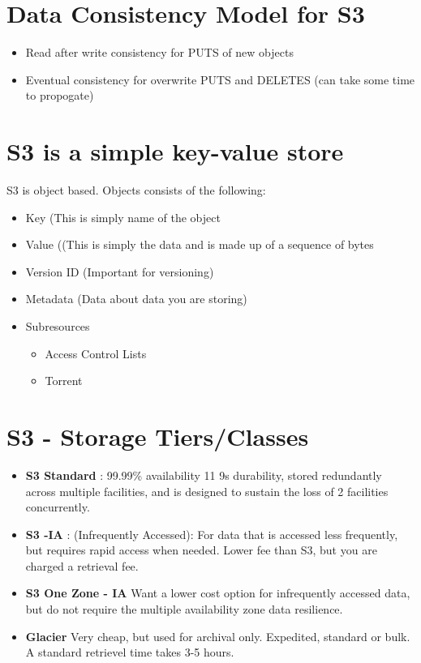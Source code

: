 \documentclass{article}
\begin{document}
\section{Data Consistency Model for S3}
\begin{itemize}
\item
Read after write consistency for PUTS of new objects

\item
Eventual consistency for overwrite PUTS and DELETES (can take some time to propogate)
\end{itemize}

\section{S3 is a simple key-value store}
S3 is object based. Objects consists of the following:
\begin{itemize}
\item
Key (This is simply name of the object
\item
Value ((This is simply the data and is made up of a sequence of bytes
\item
Version ID (Important for versioning)
\item
Metadata (Data about data you are storing)
\item
Subresources
	\begin{itemize}
	\item
	Access Control Lists
	
	\item
	Torrent
	
	\end{itemize}
\end{itemize}

\section{S3 - Storage Tiers/Classes}
\begin{itemize}
\item
\textbf{S3 Standard} : 99.99\% availability 11 9s durability, stored redundantly across multiple facilities, and is designed to sustain the loss of 2 facilities concurrently.

\item
\textbf{S3 -IA} : (Infrequently Accessed): For data that is accessed less frequently, but requires rapid access when needed. Lower fee than S3, but you are charged a retrieval fee.

\item
\textbf{S3 One Zone - IA} Want a lower cost option for infrequently accessed data, but do not require the multiple availability zone data resilience.

\item
\textbf{Glacier} Very cheap, but used for archival only. Expedited, standard or bulk. A standard retrievel time takes 3-5 hours.
\end{itemize}
\end{document}
